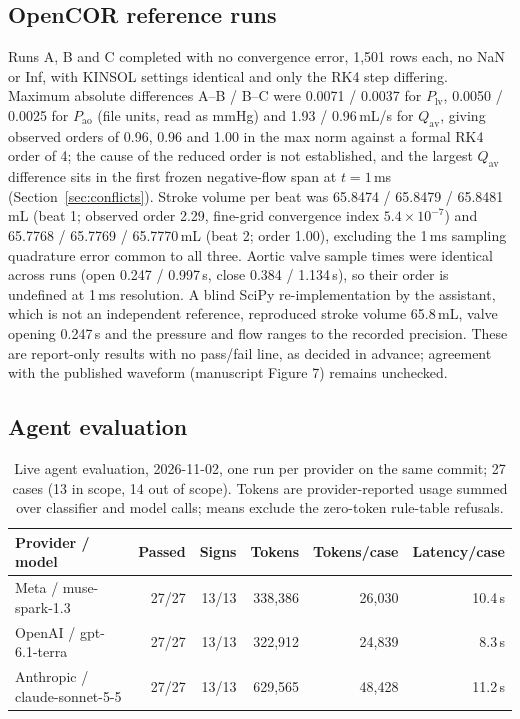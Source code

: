 \documentclass[11pt,letterpaper]{article}
\begin{document}
\subsection{OpenCOR reference runs}

Runs A, B and C completed with no convergence error, 1{,}501 rows each, no NaN or Inf, with KINSOL settings identical and only the RK4 step differing. Maximum absolute differences A--B / B--C were 0.0071 / 0.0037 for $P_{\mathrm{lv}}$, 0.0050 / 0.0025 for $P_{\mathrm{ao}}$ (file units, read as mmHg) and 1.93 / 0.96\,mL/s for $Q_{\mathrm{av}}$, giving observed orders of 0.96, 0.96 and 1.00 in the max norm against a formal RK4 order of 4; the cause of the reduced order is not established, and the largest $Q_{\mathrm{av}}$ difference sits in the first frozen negative-flow span at $t=1$\,ms (Section~\ref{sec:conflicts}). Stroke volume per beat was 65.8474 / 65.8479 / 65.8481\,mL (beat 1; observed order 2.29, fine-grid convergence index $5.4\times10^{-7}$) and 65.7768 / 65.7769 / 65.7770\,mL (beat 2; order 1.00), excluding the 1\,ms sampling quadrature error common to all three. Aortic valve sample times were identical across runs (open 0.247 / 0.997\,s, close 0.384 / 1.134\,s), so their order is undefined at 1\,ms resolution. A blind SciPy re-implementation by the assistant, which is not an independent reference, reproduced stroke volume 65.8\,mL, valve opening 0.247\,s and the pressure and flow ranges to the recorded precision. These are report-only results with no pass/fail line, as decided in advance; agreement with the published waveform (manuscript Figure 7) remains unchecked.

\subsection{Agent evaluation}

\begin{table}[t]
\centering\small
\caption{Live agent evaluation, 2026-11-02, one run per provider on the same commit; 27 cases (13 in scope, 14 out of scope). Tokens are provider-reported usage summed over classifier and model calls; means exclude the zero-token rule-table refusals.}
\label{tab:agent}
\begin{tabular}{lrrrrr}
\toprule
Provider / model & Passed & Signs & Tokens & Tokens/case & Latency/case \\
\midrule
Meta / muse-spark-1.3 & 27/27 & 13/13 & 338{,}386 & 26{,}030 & 10.4\,s \\
OpenAI / gpt-6.1-terra & 27/27 & 13/13 & 322{,}912 & 24{,}839 & 8.3\,s \\
Anthropic / claude-sonnet-5-5 & 27/27 & 13/13 & 629{,}565 & 48{,}428 & 11.2\,s \\
\bottomrule
\end{tabular}
\end{table}
\end{document}
